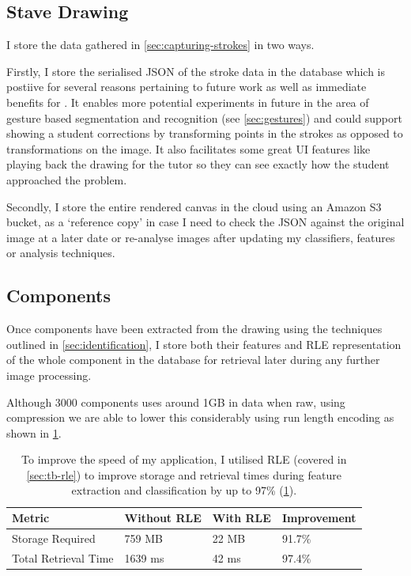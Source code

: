 \subsection{Stave Drawing}
I store the data gathered in \cref{sec:capturing-strokes} in two ways.

Firstly, I store the serialised JSON of the stroke data in the database which is postiive for several reasons pertaining to future work as well as immediate benefits for \noteED. It enables more potential experiments in future in the area of gesture based segmentation and recognition (see \cref{sec:gestures}) and could support showing a student corrections by transforming points in the strokes as opposed to transformations on the image. It also facilitates some great UI features like playing back the drawing for the tutor so they can see exactly how the student approached the problem.

Secondly, I store the entire rendered canvas in the cloud using an Amazon S3 bucket, as a `reference copy' in case I need to check the JSON against the original image at a later date or re-analyse images after updating my classifiers, features or analysis techniques.

\subsection{Components}

Once components have been extracted from the drawing using the techniques outlined in \cref{sec:identification}, I store both their features and \acrfull{RLE} representation of the whole component in the database for retrieval later during any further image processing.

Although 3000 components uses around 1GB in data when raw, using compression we are able to lower this considerably using run length encoding as shown in \ref{table:rle-improvement}.

\begin{table}[H]

    \begin{tabularx}{\textwidth}{ X X X X }
    \toprule
    Metric                  & Without RLE   & With RLE   & Improvement \\
    \midrule
    Storage Required        & 759 MB        & 22 MB      & 91.7\%      \\
    Total Retrieval Time    & 1639 ms       & 42 ms      & 97.4\% \\
    \bottomrule
    \end{tabularx}

    \caption{To improve the speed of my application, I utilised \acrfull{RLE} (covered in \cref{sec:tb-rle}) to improve storage and retrieval times during feature extraction and classification by up to 97\% (\cref{table:rle-improvement}).}
    \label{table:rle-improvement}
\end{table}

